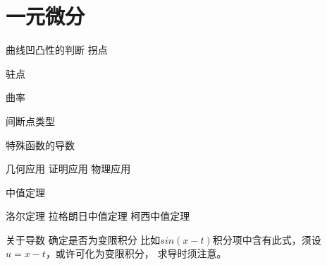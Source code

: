 \chapter{一元微分}

曲线凹凸性的判断
拐点

驻点

曲率

间断点类型

特殊函数的导数

几何应用
证明应用
物理应用

中值定理

洛尔定理
拉格朗日中值定理
柯西中值定理

关于导数
确定是否为变限积分
比如$sin(x-t)$积分项中含有此式，须设$u=x-t$，或许可化为变限积分，
求导时须注意。




